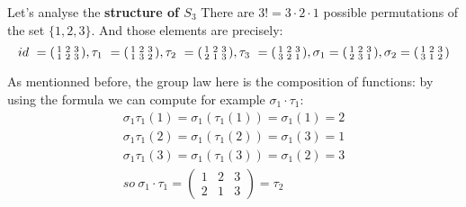 \begin{example}
    
    \label{ex:permutation-S3}
    Let's analyse the \textbf{structure of $S_3$}
    There are $3! = 3\cdot 2\cdot 1$ possible permutations of the set $\{1, 2, 3\}$. And those elements are precisely:
    $$
    id\ = \begin{psmallmatrix}
        1 & 2 & 3 \\
        1 & 2 & 3
    \end{psmallmatrix}
    , \tau_1\ = \begin{psmallmatrix}
        1 & 2 & 3 \\
        1 & 3 & 2
    \end{psmallmatrix}
    , \tau_2\ = \begin{psmallmatrix}
        1 & 2 & 3 \\ 
        2 & 1 & 3
    \end{psmallmatrix}
    , \tau_3\ = \begin{psmallmatrix}
        1 & 2 & 3 \\
        3 & 2 & 1
    \end{psmallmatrix}
    , \sigma_1 = \begin{psmallmatrix}
        1 & 2 & 3 \\
        2 & 3 & 1
    \end{psmallmatrix}
    , \sigma_2 = \begin{psmallmatrix}
        1 & 2 & 3 \\
        3 & 1 & 2   
    \end{psmallmatrix}
    $$
\end{example}

As mentionned before, the group law here is the composition of functions: by using the formula \label{eq:formula-permutation-product} we can compute for example $\sigma_1 \cdot \tau_1$: \begin{equation*}
    \begin{split}
    \sigma_1 \tau_1 (1) = \sigma_1(\tau_1(1)) = \sigma_1(1) = 2 \\
    \sigma_1 \tau_1 (2) = \sigma_1(\tau_1(2)) = \sigma_1(3) = 1 \\
    \sigma_1 \tau_1 (3) = \sigma_1(\tau_1(3)) = \sigma_1(2) = 3 \\
    so\ \sigma_1 \cdot \tau_1 = \begin{pmatrix}
        1 & 2 & 3 \\ 
        2 & 1 & 3
    \end{pmatrix} = \tau_2
    \end{split}
\end{equation*}

